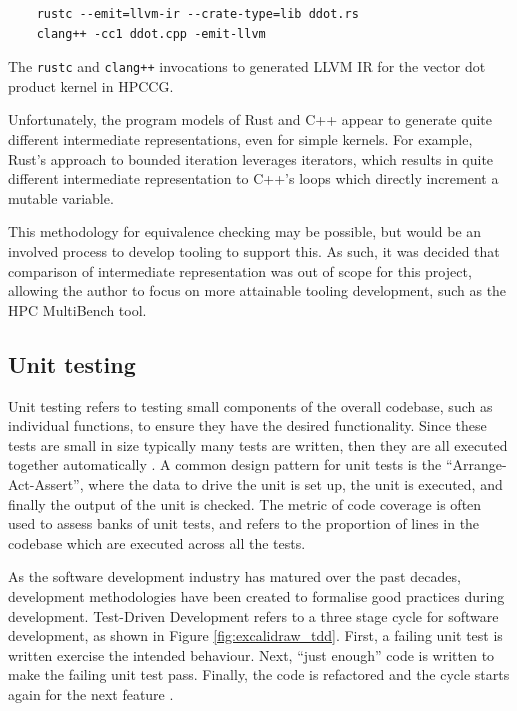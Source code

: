 \begin{code}
    \begin{verbatim}
    rustc --emit=llvm-ir --crate-type=lib ddot.rs
    clang++ -cc1 ddot.cpp -emit-llvm
    \end{verbatim}
    \caption{The \texttt{rustc} and \texttt{clang++} invocations to generated LLVM IR for the vector dot product kernel in HPCCG.}
    \label{listing:llvm-ir-generation}
\end{code}

Unfortunately, the program models of Rust and C++ appear to generate quite different intermediate representations, even for simple kernels. For example, Rust's approach to bounded iteration leverages iterators, which results in quite different intermediate representation to C++'s loops which directly increment a mutable variable.

This methodology for equivalence checking may be possible, but would be an involved process to develop tooling to support this. As such, it was decided that comparison of intermediate representation was out of scope for this project, allowing the author to focus on more attainable tooling development, such as the HPC MultiBench tool.

\subsection{Unit testing}
\label{ssec:equivalence-unit-testing}

Unit testing refers to testing small components of the overall codebase, such as individual functions, to ensure they have the desired functionality. Since these tests are small in size typically many tests are written, then they are all executed together automatically \cite{archiveddocsTestEarlyOften2012}. A common design pattern for unit tests is the ``Arrange-Act-Assert'', where the data to drive the unit is set up, the unit is executed, and finally the output of the unit is checked. The metric of code coverage is often used to assess banks of unit tests, and refers to the proportion of lines in the codebase which are executed across all the tests.

As the software development industry has matured over the past decades, development methodologies have been created to formalise good practices during development. Test-Driven Development refers to a three stage cycle for software development, as shown in Figure \ref{fig:excalidraw_tdd}. First, a failing unit test is written exercise the intended behaviour. Next, ``just enough'' code is written to make the failing unit test pass. Finally, the code is refactored and the cycle starts again for the next feature \cite{beckTestDrivenDevelopment2022}.

